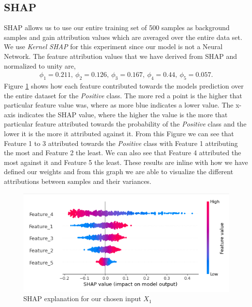 \subsection{SHAP}
SHAP allows us to use our entire training set of 500 samples as background samples and gain attribution values which are averaged over the entire data set. We use \emph{Kernel SHAP} for this experiment since our model is not a Neural Network. The feature attribution values that we have derived from SHAP and normalized to unity are,
 \begin{align*}
    \phi_1 = 0.211, \ \phi_2 = 0.126, \ \phi_3 = 0.167 ,\ \phi_4 = 0.44, \ \phi_5 = 0.057.
\end{align*}
Figure \ref{fig:shap-ground} shows how each feature contributed towards the models prediction over the entire dataset for the \emph{Positive} class. The more red a point is the higher that particular feature value was, where as more blue indicates a lower value. The x-axis indicates the SHAP value, where the higher the value is the more that particular feature attributed towards the probability of the \emph{Positive} class and the lower it is the more it attributed against it. From this Figure we can see that Feature 1 to 3 attributed towards the \emph{Positive} class with Feature 1 attributing the most and Feature 2 the least. We can also see that Feature 4 attributed the most against it and Feature 5 the least. These results are inline with how we have defined our weights and from this graph we are able to visualize the different attributions between samples and their variances.
\begin  {figure}[!htpb]
  \includegraphics[width=\linewidth]{Evaluation_Images/shap_ground.png}
\caption{SHAP explanation for our chosen input $X_1$}
 \label{fig:shap-ground}
\end{figure}

